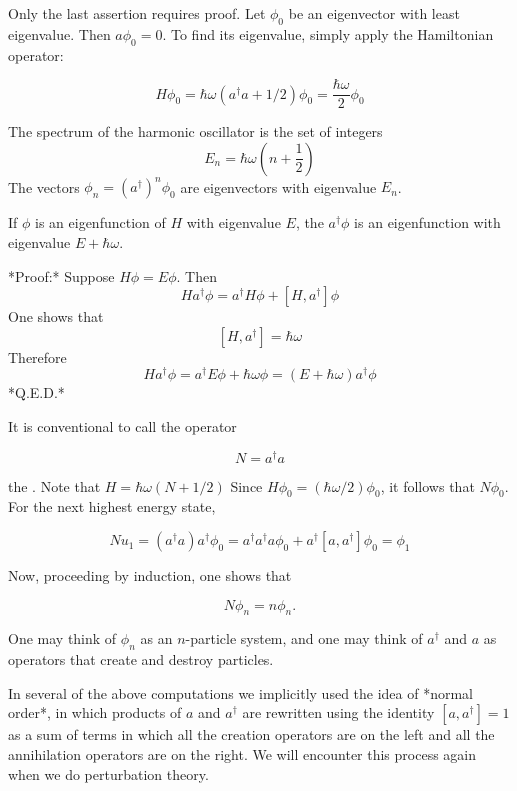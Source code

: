 Only the last assertion requires proof.  Let $\phi_0$ be an eigenvector with least eigenvalue.  Then $a\phi_0 = 0$.  To find its eigenvalue, simply apply the Hamiltonian operator:


\begin{equation}
H\phi_0 = \hbar\omega(a^\dagger a + 1/2)\phi_0 = \frac{\hbar\omega}{2}\phi_0 
\end{equation}


\begin{theorem}
The spectrum of the harmonic oscillator is the set of integers
\[
  E_n = \hbar\omega\left(n + \frac{1}{2}\right)
\]
The vectors $\phi_n = (a^\dagger)^n \phi_0$ are eigenvectors with eigenvalue $E_n$.
\end{theorem}


\begin{theorem}
If $\phi$ is an eigenfunction of $H$ with 
eigenvalue $E$, the $a^\dagger \phi$ is an eigenfunction
with eigenvalue $E + \hbar\omega$.
\end{theorem}

*Proof:* Suppose $H\phi = E\phi$. Then
\[
  Ha^\dagger \phi = a^\dagger H\phi + [H, a^\dagger ]\phi
\]
One shows that 
\[
  [H,a^\dagger]  = \hbar\omega
\]
Therefore
\[
   Ha^\dagger \phi = a^\dagger E\phi + \hbar\omega \phi
  = (E + \hbar\omega)a^\dagger  \phi
\]
*Q.E.D.*

It is conventional to call the operator

\begin{equation}
 N = a^\dagger a
\end{equation}

the .  Note that $H = \hbar\omega(N + 1/2)$ Since $H\phi_0 = (\hbar\omega/2)\phi_0$, it
follows that $N\phi_0$.    For the next highest energy state,

\begin{equation}
Nu_1 = (a^\dagger a)a^\dagger  \phi_0 = a^\dagger a^\dagger a \phi_0 + a^\dagger [a, a^\dagger]\phi_0 =\phi_1
\end{equation}

Now, proceeding by induction, one shows that

\begin{equation}
   N\phi_n = n\phi_n.
\end{equation}

One may think of $\phi_n$ as an $n$-particle system, and one may think of $a^\dagger$ and $a$ as operators that create and destroy particles.


\begin{remark}
In several of the above computations we implicitly used the idea of *normal order*, in which products of $a$ and $a^\dagger$ are rewritten using the identity $[a,a^\dagger] = 1$  as a sum of terms in which all the creation operators are on the left and all the annihilation operators are on the right. We will encounter this process again when we do perturbation theory.
\end{remark}


